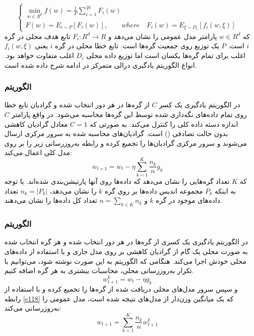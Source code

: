 \begin{equation}\label{e115}
	\begin{cases}
		\min_{w\in R^d} f(w)=\frac{1}{P} \sum_{i=1}^{|p|}F_i(w)\\
		F(w)=E_{i\sim P}[F_i(w)], \qquad  where \quad F_i(w)=E_{\xi\sim D_i}[f_i(w,\xi)]
	\end{cases}
\end{equation}
که $w\in R^d$ پارامتر مدل عمومی را نشان می‌دهد و $F_i: R^d\to R$ تابع هدف محلی در گره $i$ است. $P$ یک توزیع روی جمعیت گره‌ها است. تابع خطا محلی در گره $i$ یعنی $f_i(w,\xi)$ اغلب برای تمام گره‌ها یکسان است اما توزیع داده محلی $D_i$ اغلب متفاوت خواهد بود. انواع الگوریتم یادگیری درالی متمرکز در ادامه شرح داده شده است.

\subsubsection{الگوریتم }
در الگوریتم یادگیری  یک کسر $C$ از گره‌ها در هر دور انتخاب شده و گرادیان تابع خطا روی تمام داده‌های نگه‌داری شده توسط این گره‌ها محاسبه می‌شود. در واقع پارامتر $C$ اندازه دسته داده کلی را کنترل می‌کند. به صورتی که $C=1$ معادل گرادیان کاهشی  بدون حالت تصادفی () است. گرادیان‌های محاسبه شده به سرور مرکزی ارسال می‌شوند و سرور مرکزی گرادیان‌ها را تجمیع کرده و رابطه به‌روزرسانی زیر را بر روی مدل کلی اعمال می‌کند:
\begin{equation}\label{e116}
	w_{t+1}=w_t-\eta \sum_{k=1}^K \frac{n_k}{n}g_k
\end{equation}
که $K$ تعداد گره‌هایی را نشان می‌دهد که داده‌ها روی آنها پارتیشن‌بندی شده‌اند. با توجه به اینکه $P_k$ مجموعه اندیس داده‌ها بر روی گره $k$ را نشان می‌دهد، $n_k=|P_k|$ تعداد داده‌های موجود در گره $k$ و $n=\sum_{k\in K} n_k$ تعداد کل داده‌ها را نشان می‌دهند. 

\subsubsection{الگوریتم }
در الگوریتم یادگیری  یک کسری از گره‌ها در هر دور انتخاب شده و هر گره انتخاب شده به صورت محلی یک گام از گرادیان کاهشی بر روی مدل جاری و با استفاده از داده‌های محلی خودش اجرا می‌کند. هنگامی که الگوریتم به این صورت نوشته شود، می‌توانیم با تکرار به‌روزرسانی محلی، محاسبات بیشتری به هر گره اضافه کنیم. 
\begin{equation}\label{e117}
	w_{t+1}^k=w_t-\eta g_k
\end{equation}
و سپس سرور مدل‌های محلی دریافت شده از گره‌ها را تجمیع کرده و با استفاده از رابطه \ref{e118} که یک میانگین وزن‌دار از مدل‌های نتیجه شده است، مدل عمومی را به‌روزرسانی می‌کند:
\begin{equation}\label{e118}
	w_{t+1}=\sum_{k=1}^K \frac{n_k}{n}w_{t+1}^k
\end{equation}

